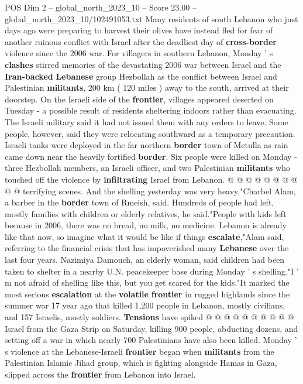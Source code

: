 \begin{textsample}{POS Dim 2 – global\_north\_2023\_10 – Score 23.00 – global\_north\_2023\_10/102491053.txt}  \label{ex:f2_pos_145}
Many residents of south Lebanon who just days ago were preparing to harvest their olives have instead fled for fear of another ruinous conflict with Israel after the deadliest day of \textbf{cross-border} violence since the 2006 war.
For villagers in southern Lebanon, Monday ' s \textbf{clashes} stirred memories of the devastating 2006 war between Israel and the \textbf{Iran-backed} \textbf{Lebanese} group Hezbollah as the conflict between Israel and Palestinian \textbf{militants}, 200 km ( 120 miles ) away to the south, arrived at their doorstep.
On the Israeli side of the \textbf{frontier}, villages appeared deserted on Tuesday - a possible result of residents sheltering indoors rather than evacuating.
The Israeli military said it had not issued them with any orders to leave.
Some people, however, said they were relocating southward as a temporary precaution.
Israeli tanks were deployed in the far northern \textbf{border} town of Metulla as rain came down near the heavily fortified \textbf{border}.
Six people were killed on Monday - three Hezbollah members, an Israeli officer, and two Palestinian \textbf{militants} who touched off the violence by \textbf{infiltrating} Israel from Lebanon. @ @ @ @ @ @ @ @ @ @ terrifying scenes.
And the shelling yesterday was very heavy,"Charbel Alam, a barber in the \textbf{border} town of Rmeish, said.
Hundreds of people had left, mostly families with children or elderly relatives, he said."People with kids left because in 2006, there was no bread, no milk, no medicine.
Lebanon is already like that now, so imagine what it would be like if things \textbf{escalate},"Alam said, referring to the financial crisis that has impoverished many \textbf{Lebanese} over the last four years.
Nazimiya Damouch, an elderly woman, said children had been taken to shelter in a nearby U.N. peacekeeper base during Monday ' s shelling."I ' m not afraid of shelling like this, but you get scared for the kids."It marked the most serious \textbf{escalation} at the \textbf{volatile} \textbf{frontier} in rugged highlands since the summer war 17 year ago that killed 1,200 people in Lebanon, mostly civilians, and 157 Israelis, mostly soldiers. \textbf{Tensions} have spiked @ @ @ @ @ @ @ @ @ @ Israel from the Gaza Strip on Saturday, killing 900 people, abducting dozens, and setting off a war in which nearly 700 Palestinians have also been killed.
Monday ' s violence at the Lebanese-Israeli \textbf{frontier} began when \textbf{militants} from the Palestinian Islamic Jihad group, which is fighting alongside Hamas in Gaza, slipped across the \textbf{frontier} from Lebanon into Israel.

\end{textsample}

